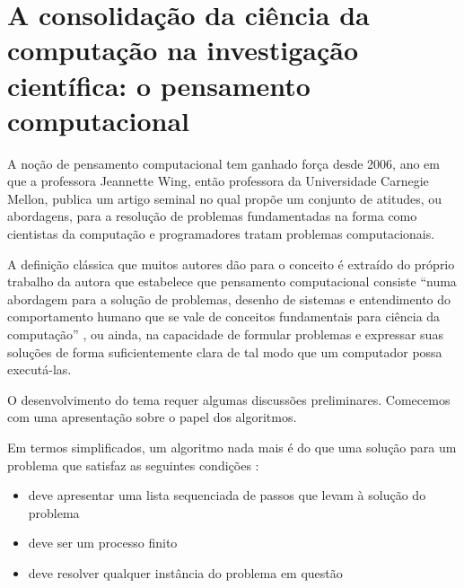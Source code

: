 \section{A consolidação da ciência da computação na investigação científica: o pensamento computacional}

A noção de pensamento computacional tem ganhado força desde 2006, ano em que a professora Jeannette Wing, então professora da Universidade Carnegie Mellon, publica um artigo seminal no qual propõe um conjunto de atitudes, ou abordagens, para a resolução de problemas fundamentadas na forma como cientistas da computação e programadores tratam problemas computacionais. 

A definição clássica que muitos autores dão para o conceito é extraído do próprio trabalho da autora que estabelece que pensamento computacional consiste ``numa abordagem para a solução de problemas, desenho de sistemas e entendimento do comportamento humano que se vale de conceitos fundamentais para ciência da computação'' \cite[Tradução nossa]{wing2006}, ou ainda, na capacidade de formular problemas e expressar suas soluções de forma suficientemente clara de tal modo que um computador possa executá-las.

O desenvolvimento do tema requer algumas discussões preliminares. Comecemos com uma apresentação sobre o papel dos algoritmos.

Em termos simplificados, um algoritmo nada mais é do que uma solução para um problema que satisfaz as seguintes condições \cite{Piwek2016}:

\begin{itemize}
	\item deve apresentar uma lista sequenciada de passos que levam à solução do problema 
	\item deve ser um processo finito
	\item deve resolver qualquer instância do problema em questão
\end{itemize}

